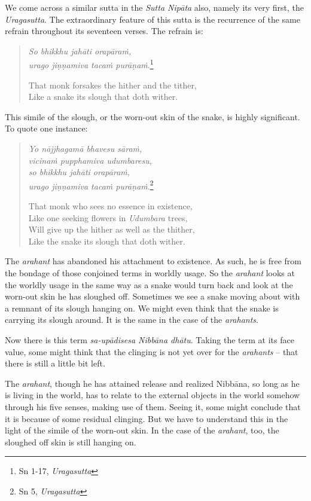 We come across a similar sutta in the \emph{Sutta Nipāta} also, namely its very first, the \emph{Uragasutta}. The extraordinary feature of this sutta is the recurrence of the same refrain throughout its seventeen verses. The refrain is:

\begin{quote}
\emph{So bhikkhu jahāti orapāraṁ,}\\
\emph{urago jiṇṇamiva tacaṁ purāṇaṁ}.\footnote{Sn 1-17, \emph{Uragasutta}}

That monk forsakes the hither and the tither,\\
Like a snake its slough that doth wither.
\end{quote}

This simile of the slough, or the worn-out skin of the snake, is highly significant. To quote one instance:

\enlargethispage{\baselineskip}

\begin{quote}
\emph{Yo nājjhagamā bhavesu sāraṁ,}\\
\emph{vicinaṁ pupphamiva udumbaresu,}\\
\emph{so bhikkhu jahāti orapāraṁ,}\\
\emph{urago jiṇṇamiva tacaṁ purāṇaṁ}.\footnote{Sn 5, \emph{Uragasutta}}

That monk who sees no essence in existence,\\
Like one seeking flowers in \emph{Udumbara} trees,\\
Will give up the hither as well as the thither,\\
Like the snake its slough that doth wither.
\end{quote}

The \emph{arahant} has abandoned his attachment to existence. As such, he is free from the bondage of those conjoined terms in worldly usage. So the \emph{arahant} looks at the worldly usage in the same way as a snake would turn back and look at the worn-out skin he has sloughed off. Sometimes we see a snake moving about with a remnant of its slough hanging on. We might even think that the snake is carrying its slough around. It is the same in the case of the \emph{arahants}.

Now there is this term \emph{sa-upādisesa Nibbāna dhātu}. Taking the term at its face value, some might think that the clinging is not yet over for the \emph{arahants} -- that there is still a little bit left.

The \emph{arahant}, though he has attained release and realized Nibbāna, so long as he is living in the world, has to relate to the external objects in the world somehow through his five senses, making use of them. Seeing it, some might conclude that it is because of some residual clinging. But we have to understand this in the light of the simile of the worn-out skin. In the case of the \emph{arahant}, too, the sloughed off skin is still hanging on.

